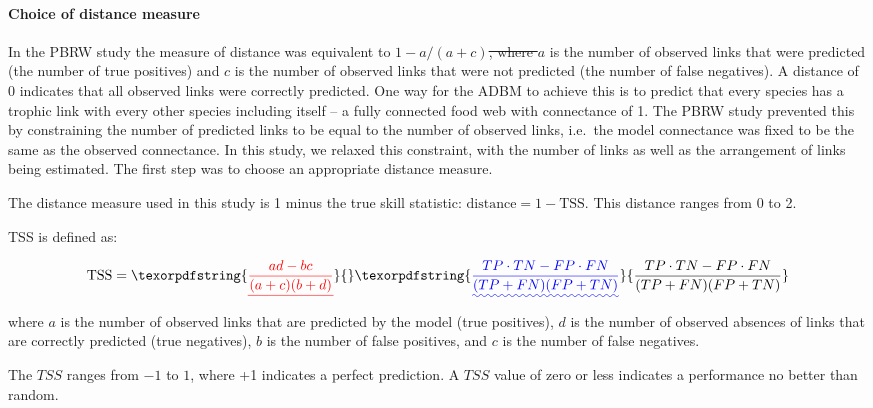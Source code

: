 \documentclass{article}
\providecommand{\DIFaddtex}[1]{{\protect\color{blue}\uwave{#1}}} %
\providecommand{\DIFdeltex}[1]{{\protect\color{red}\sout{#1}}}                      %
\providecommand{\DIFaddbegin}{} %
\providecommand{\DIFaddend}{} %
\providecommand{\DIFdelbegin}{} %
\providecommand{\DIFdelend}{} %
\providecommand{\DIFadd}[1]{\texorpdfstring{\DIFaddtex{#1}}{#1}} %
\providecommand{\DIFdel}[1]{\texorpdfstring{\DIFdeltex{#1}}{}} %
\newcommand{\DIFscaledelfig}{0.5}
\newlength{\DIFdelgraphicswidth} %
\newlength{\DIFdelgraphicsheight} %
\newcommand{\DIFaddincludegraphics}[2][]{{\color{blue}\fbox{\DIFOincludegraphics[#1]{#2}}}} %
\newcommand{\DIFdelincludegraphics}[2][]{%
\sbox{\DIFdelgraphicsbox}{\DIFOincludegraphics[#1]{#2}}%
\settoboxwidth{\DIFdelgraphicswidth}{\DIFdelgraphicsbox} %
\settoboxtotalheight{\DIFdelgraphicsheight}{\DIFdelgraphicsbox} %
\scalebox{\DIFscaledelfig}{%
\parbox[b]{\DIFdelgraphicswidth}{\usebox{\DIFdelgraphicsbox}\\[-\baselineskip] \rule{\DIFdelgraphicswidth}{0em}}\llap{\resizebox{\DIFdelgraphicswidth}{\DIFdelgraphicsheight}{%
\setlength{\unitlength}{\DIFdelgraphicswidth}%
\begin{picture}(1,1)%
\thicklines\linethickness{2pt} %
{\color[rgb]{1,0,0}\put(0,0){\framebox(1,1){}}}%
{\color[rgb]{1,0,0}\put(0,0){\line( 1,1){1}}}%
{\color[rgb]{1,0,0}\put(0,1){\line(1,-1){1}}}%
\end{picture}%
}\hspace*{3pt}}} %
} %
\DeclareRobustCommand{\DIFaddbegin}{\DIFOaddbegin \let\includegraphics\DIFaddincludegraphics} %
\DeclareRobustCommand{\DIFaddend}{\DIFOaddend \let\includegraphics\DIFOincludegraphics} %
\DeclareRobustCommand{\DIFdelbegin}{\DIFOdelbegin \let\includegraphics\DIFdelincludegraphics} %
\DeclareRobustCommand{\DIFdelend}{\DIFOaddend \let\includegraphics\DIFOincludegraphics} %
\begin{document}
\DIFaddbegin \hypertarget{choice-of-distance-measure}{%
\paragraph{Choice of distance
measure}\label{choice-of-distance-measure}}

\DIFaddend In the PBRW study the measure of distance was equivalent to
\DIFdelbegin \DIFdel{\(1 - a / (a + c)\), where \(a\) }\DIFdelend \DIFaddbegin \DIFadd{\(1 - TP / (TP + FN)\), where \(TP\) }\DIFaddend is the number of observed links
that were predicted (the number of true positives) and \DIFdelbegin \DIFdel{\(c\) }\DIFdelend \DIFaddbegin \DIFadd{\(FN\) }\DIFaddend is the
number of observed links that were not predicted (the number of false
negatives). A distance of 0 indicates that all observed links were
correctly predicted. One way for the ADBM to achieve this is to predict
that every species has a trophic link with every other species including
itself -- a fully connected food web with connectance of 1. The PBRW
study prevented this by constraining the number of predicted links to be
equal to the number of observed links, i.e.~the model connectance was
fixed to be the same as the observed connectance. In this study, we
relaxed this constraint, with the number of links as well as the
arrangement of links being estimated. The first step was to choose an
appropriate distance measure.

The distance measure used in this study is 1 minus the true skill
statistic: \(\text{distance} = 1 - \text{TSS}\). This distance ranges
from 0 to 2.

TSS is defined as:

\[ \text{TSS} = \DIFdelbegin \DIFdel{\frac{ad-bc}{(a+c)(b+d)} }\DIFdelend \DIFaddbegin \DIFadd{\frac{TP\cdot TN- FP \cdot FN}{(TP+FN)(FP+TN)} }\DIFaddend \] where
\DIFdelbegin \DIFdel{\(a\) }\DIFdelend \DIFaddbegin \DIFadd{\(TP\) }\DIFaddend is the number of observed links that are predicted by the model
(true positives), \DIFdelbegin \DIFdel{\(d\)
}\DIFdelend \DIFaddbegin \DIFadd{\(TN\) }\DIFaddend is the number of observed absences of links
that are correctly predicted (true negatives), \DIFdelbegin \DIFdel{\(b\) }\DIFdelend \DIFaddbegin \DIFadd{\(FP\) }\DIFaddend is the number of
false positives, and \DIFdelbegin \DIFdel{\(c\) }\DIFdelend \DIFaddbegin \DIFadd{\(FN\) }\DIFaddend is the number of false negatives.

The \(TSS\) ranges from \(-1\) to \(1\), where +1 indicates a perfect
prediction. A \(TSS\) value of zero or less indicates a performance no
better than random.
\end{document}
